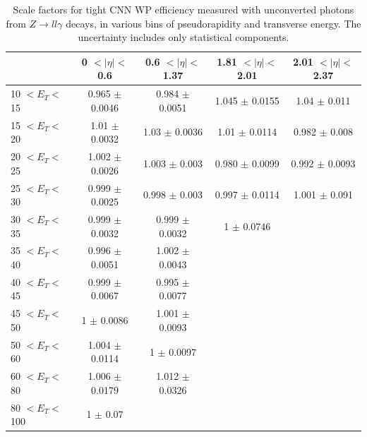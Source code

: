 \begin{table}[htbp]
    \centering
   \begin{tabular}{lcccc}
   \hline\hline
     & 0 $ < |\eta| < $ 0.6 & 0.6 $ < |\eta| < $ 1.37 & 1.81 $ < |\eta| < $ 2.01  & 2.01 $ < |\eta| < $ 2.37 \\
    \hline
10 $ < E_T < $ 15   & 0.965 $\pm$ 0.0046 & 0.984 $\pm$ 0.0051 & 1.045 $\pm$ 0.0155 & 1.04 $\pm$ 0.011\\
15 $ < E_T < $ 20   & 1.01 $\pm$  0.0032 & 1.03 $\pm$ 0.0036  & 1.01 $\pm$ 0.0114 & 0.982 $\pm$ 0.008 \\
20 $ < E_T < $ 25   & 1.002 $\pm$ 0.0026 & 1.003 $\pm$ 0.003  & 0.980 $\pm$ 0.0099 & 0.992 $\pm$ 0.0093\\
25 $ < E_T < $ 30   & 0.999 $\pm$ 0.0025 & 0.998 $\pm$ 0.003  & 0.997 $\pm$ 0.0114 & 1.001 $\pm$ 0.091\\
30 $ < E_T < $ 35   & 0.999 $\pm$ 0.0032 & 0.999 $\pm$ 0.0032 & 1     $\pm$ 0.0746 & \\
35 $ < E_T < $ 40   & 0.996 $\pm$ 0.0051 & 1.002 $\pm$ 0.0043 &                    & \\
40 $ < E_T < $ 45   & 0.999 $\pm$ 0.0067 & 0.995 $\pm$ 0.0077 &                    & \\
45 $ < E_T < $ 50   & 1     $\pm$ 0.0086 & 1.001 $\pm$ 0.0093 &                    & \\
50 $ < E_T < $ 60   & 1.004 $\pm$ 0.0114 & 1     $\pm$ 0.0097 &                    & \\
60 $ < E_T < $ 80   & 1.006 $\pm$ 0.0179 & 1.012 $\pm$ 0.0326 &                    & \\
80 $ < E_T < $ 100  & 1     $\pm$ 0.07   &                    &                    & \\
\hline\hline
\end{tabular}
\begin{tcolorbox}[colback=black!5!white,colframe=white!75!black]
\caption{Scale factors for tight CNN WP efficiency measured with unconverted photons from $Z\rightarrow ll\gamma$ decays, in various bins of pseudorapidity and transverse energy. The uncertainty includes only statistical components.}
\label{tab:gamma:CNN:Zllg:SF:UnC}
\end{tcolorbox}
\end{table}
